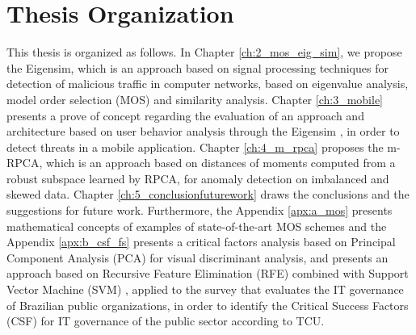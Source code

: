\section{Thesis Organization}
\label{sc:organization}

This thesis is organized as follows. In Chapter \ref{ch:2_mos_eig_sim}, we propose the Eigensim, which is an approach based on signal processing techniques for detection of malicious traffic in computer networks, based on eigenvalue analysis, model order selection (MOS) and similarity analysis. Chapter \ref{ch:3_mobile} presents a prove of concept regarding the evaluation of an approach and architecture based on user behavior analysis through the Eigensim  \cite{tenorio2013greatest}, in order to detect threats in a mobile application. Chapter \ref{ch:4_m_rpca} proposes the m-RPCA, which is an approach based on distances of moments computed from a robust subspace learned by RPCA, for anomaly detection on imbalanced and skewed data. Chapter \ref{ch:5_conclusionfuturework} draws the conclusions and the suggestions for future work. Furthermore, the Appendix \ref{apx:a_mos} presents mathematical concepts of examples of state-of-the-art MOS schemes and the Appendix \ref{apx:b_csf_fs} presents a critical factors analysis based on Principal Component Analysis (PCA) for visual discriminant analysis, and presents an approach based on Recursive Feature Elimination (RFE) combined with Support Vector Machine (SVM) \cite{hearst1998support}, applied to the survey that evaluates the IT governance of Brazilian public organizations, in order to identify the Critical Success Factors (CSF) for IT governance of the public sector according to TCU.